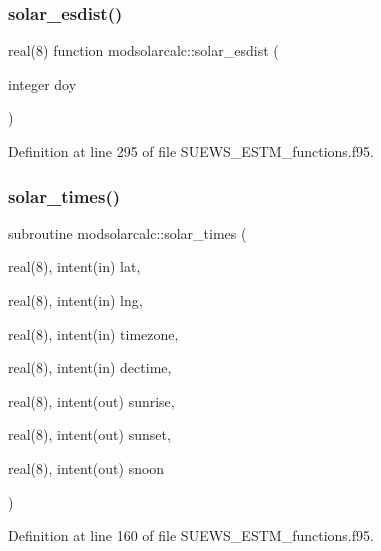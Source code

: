 \subsubsection{\texorpdfstring{solar\+\_\+esdist()}{solar\_esdist()}}
{\footnotesize\ttfamily real(8) function modsolarcalc\+::solar\+\_\+esdist (\begin{DoxyParamCaption}\item[{integer}]{doy }\end{DoxyParamCaption})}



Definition at line 295 of file S\+U\+E\+W\+S\+\_\+\+E\+S\+T\+M\+\_\+functions.\+f95.

\mbox{\label{namespacemodsolarcalc_a2fbd1d33b3bd03fd930a2a3d93b83599}} 
\subsubsection{\texorpdfstring{solar\+\_\+times()}{solar\_times()}}
{\footnotesize\ttfamily subroutine modsolarcalc\+::solar\+\_\+times (\begin{DoxyParamCaption}\item[{real(8), intent(in)}]{lat,  }\item[{real(8), intent(in)}]{lng,  }\item[{real(8), intent(in)}]{timezone,  }\item[{real(8), intent(in)}]{dectime,  }\item[{real(8), intent(out)}]{sunrise,  }\item[{real(8), intent(out)}]{sunset,  }\item[{real(8), intent(out)}]{snoon }\end{DoxyParamCaption})}



Definition at line 160 of file S\+U\+E\+W\+S\+\_\+\+E\+S\+T\+M\+\_\+functions.\+f95.

\mbox{\label{namespacemodsolarcalc_a8e5e61f1a3537693aa4ca5527f74233e}} 
